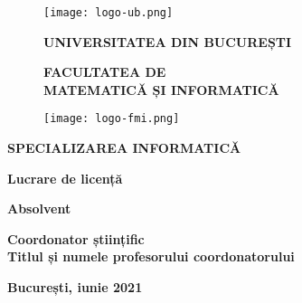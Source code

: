 \begin{titlepage}


\begin{figure}[!htb]
    \centering
    \begin{minipage}{0.2\textwidth}
        \texttt{[image: logo-ub.png]}
    \end{minipage}
    \begin{minipage}{0.5\textwidth}
        \large
        \vspace{0.2cm}
        \begin{center}
            \textbf{UNIVERSITATEA DIN BUCUREȘTI}
        \end{center}
        \vspace{0.3cm}
        \begin{center}
            \textbf{
                FACULTATEA DE \\
                MATEMATICĂ ȘI INFORMATICĂ
            }
        \end{center}
    \end{minipage}
    \begin{minipage}{0.2\textwidth}
        \texttt{[image: logo-fmi.png]}
    \end{minipage}
\end{figure}

\begin{center}
\textbf{SPECIALIZAREA INFORMATICĂ}
\end{center}

\vspace{1cm}

\begin{center}
\Large \textbf{Lucrare de licență}
\end{center}

\begin{center}
\huge \textbf{\MakeUppercase{\@title}}
\end{center}

\vspace{3cm}

\begin{center}
\large \textbf{Absolvent \\ \@author}
\end{center}

\vspace{0.25cm}

\begin{center}
\large \textbf{Coordonator științific \\ Titlul și numele profesorului coordonatorului}
\end{center}

\vspace{2cm}

\begin{center}
\Large \textbf{București, iunie 2021}
\end{center}
\end{titlepage}